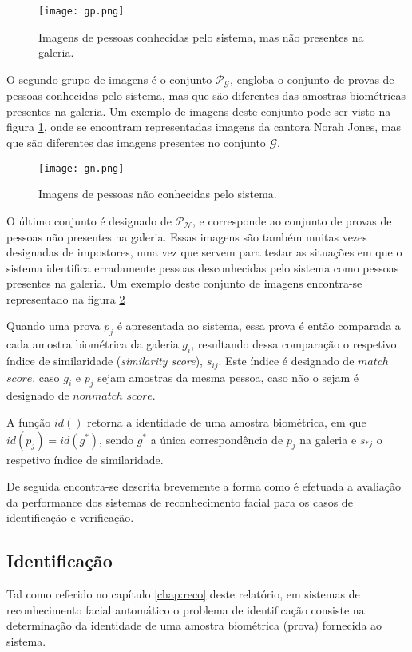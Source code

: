 \begin{figure}[ht]
  \begin{center}
    \leavevmode
    \texttt{[image: gp.png]}
    \caption{Imagens de pessoas conhecidas pelo sistema, mas não presentes na galeria.}	
    \label{fig:gp}
  \end{center}
\end{figure}
O segundo grupo de imagens é o conjunto $\mathscr{P}_\mathscr{G}$, engloba o conjunto de provas de pessoas conhecidas pelo sistema, mas que são diferentes das amostras biométricas presentes na galeria. Um exemplo de imagens deste conjunto pode ser visto na figura \ref{fig:gp}, onde se encontram representadas imagens da cantora Norah Jones, mas que são diferentes das imagens presentes no conjunto $\mathscr{G}$.

\begin{figure}[ht]
  \begin{center}
    \leavevmode
    \texttt{[image: gn.png]}
    \caption{Imagens de pessoas não conhecidas pelo sistema.}	
    \label{fig:gn}
  \end{center}
\end{figure}
O último conjunto é designado de $\mathscr{P}_\mathscr{N}$, e corresponde ao conjunto de provas de pessoas não presentes na galeria. Essas imagens são também muitas vezes designadas de impostores, uma vez que servem para testar as situações em que o sistema identifica erradamente pessoas desconhecidas pelo sistema como pessoas presentes na galeria. Um exemplo deste conjunto de imagens encontra-se representado na figura \ref{fig:gn}

Quando uma prova $p_j$ é apresentada ao sistema, essa prova é então comparada a cada amostra biométrica da galeria $g_i$, resultando dessa comparação o respetivo índice de similaridade (\textit{similarity score}), $s_{ij}$. Este índice é designado de $match$ $score$, caso $g_i$ e $p_j$ sejam amostras da mesma pessoa, caso não o sejam é designado de $nonmatch$ $score$.

A função $id()$ retorna a identidade de uma amostra biométrica, em que $id(p_j) = id(g^*)$, sendo $g^*$ a única correspondência de $p_j$ na galeria e $s_{*j}$ o respetivo índice de similaridade.

De seguida encontra-se descrita brevemente a forma como é efetuada a avaliação da performance dos sistemas de reconhecimento facial para os casos de identificação e verificação.

\subsection{Identificação}
Tal como referido no capítulo \ref{chap:reco} deste relatório, em sistemas de reconhecimento facial automático o problema de identificação consiste na determinação da identidade de uma amostra biométrica (prova) fornecida ao sistema.

